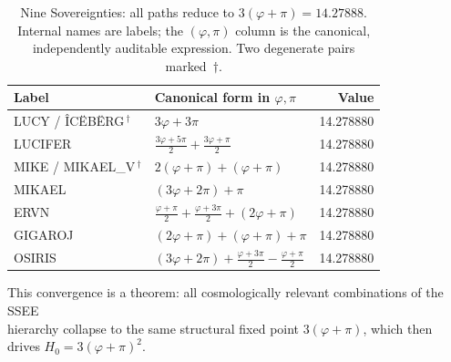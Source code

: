 \documentclass[12pt,a4paper]{article}
\newcommand{\SSEE}{\ifmmode\mathrm{SSEE}\else\textsc{ssee}\fi}
\begin{document}
\begin{table}[ht]
\centering
\caption{Nine Sovereignties: all paths reduce to $3(\varphi+\pi)=14.27888$.
  Internal names are labels; the $(\varphi,\pi)$ column is the canonical,
  independently auditable expression. Two degenerate pairs marked~$\dagger$.}
\label{tab:sovereignties}
\small
\begin{tabular}{lp{6.5cm}r}
\toprule
Label & Canonical form in $\varphi,\pi$ & Value \\
\midrule
LUCY / \^{I}C\"{E}B\"{E}RG$\,^\dagger$ & $3\varphi+3\pi$ & 14.278880 \\
LUCIFER & $\tfrac{3\varphi+5\pi}{2}+\tfrac{3\varphi+\pi}{2}$ & 14.278880 \\
MIKE / MIKAEL\_V$\,^\dagger$ & $2(\varphi+\pi)+(\varphi+\pi)$ & 14.278880 \\
MIKAEL & $(3\varphi+2\pi)+\pi$ & 14.278880 \\
ERVN & $\tfrac{\varphi+\pi}{2}+\tfrac{\varphi+3\pi}{2}+(2\varphi+\pi)$ & 14.278880 \\
GIGAROJ & $(2\varphi+\pi)+(\varphi+\pi)+\pi$ & 14.278880 \\
OSIRIS & $(3\varphi+2\pi)+\tfrac{\varphi+3\pi}{2}-\tfrac{\varphi+\pi}{2}$ & 14.278880 \\
\bottomrule
\end{tabular}
\end{table}

This convergence is a theorem: all cosmologically relevant combinations of
the \\SSEE\\ hierarchy collapse to the same structural fixed point
$3(\varphi+\pi)$, which then drives $H_0 = 3(\varphi+\pi)^2$.
\end{document}
